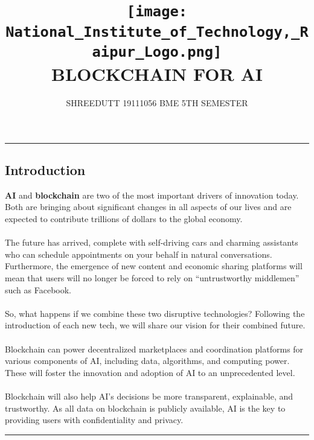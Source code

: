 \documentclass[12pt,letterpaper]{article}
\begin{document}
\title{
\texttt{[image: National\_Institute\_of\_Technology,\_Raipur\_Logo.png]}
\\ 
\textbf{BLOCKCHAIN FOR AI}
}
\author{SHREEDUTT 19111056 BME 5TH SEMESTER}
\maketitle
\rule{\textwidth}{0.1pt}

{\begin{center}
    \section* {Introduction}
\end{center}} 

\textbf{AI} and \textbf{blockchain} are two of the most important drivers of innovation today. Both are bringing about significant changes in all aspects of our lives and are expected to contribute trillions of dollars to the global economy. 
\\
\\
The future has arrived, complete with self-driving cars and charming assistants who can schedule appointments on your behalf in natural conversations. Furthermore, the emergence of new content and economic sharing platforms will mean that users will no longer be forced to rely on “untrustworthy middlemen” such as Facebook. 
\\
\\
So, what happens if we combine these two disruptive technologies? Following the introduction of each new tech, we will share our vision for their combined future.
\\
\\

Blockchain can power decentralized marketplaces and coordination platforms for various components of AI, including data, algorithms, and computing power. These will foster the innovation and adoption of AI to an unprecedented level.
\\ 
\\
Blockchain will also help AI’s decisions be more transparent, explainable, and trustworthy. As all data on blockchain is publicly available, AI is the key to providing users with confidentiality and privacy.

\rule{\textwidth}{0.1pt}
\end{document}
